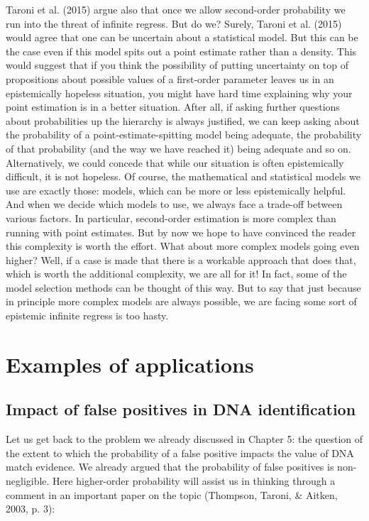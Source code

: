 \documentclass[
  10pt,
  dvipsnames,enabledeprecatedfontcommands]{scrartcl}
\begin{document}
Taroni et al. (2015) argue also that once we allow second-order
probability we run into the threat of infinite regress. But do we?
Surely, Taroni et al. (2015) would agree that one can be uncertain about
a statistical model. But this can be the case even if this model spits
out a point estimate rather than a density. This would suggest that if
you think the possibility of putting uncertainty on top of propositions
about possible values of a first-order parameter leaves us in an
epistemically hopeless situation, you might have hard time explaining
why your point estimation is in a better situation. After all, if asking
further questions about probabilities up the hierarchy is always
justified, we can keep asking about the probability of a
point-estimate-spitting model being adequate, the probability of that
probability (and the way we have reached it) being adequate and so on.
Alternatively, we could concede that while our situation is often
epistemically difficult, it is not hopeless. Of course, the mathematical
and statistical models we use are exactly those: models, which can be
more or less epistemically helpful. And when we decide which models to
use, we always face a trade-off between various factors. In particular,
second-order estimation is more complex than running with point
estimates. But by now we hope to have convinced the reader this
complexity is worth the effort. What about more complex models going
even higher? Well, if a case is made that there is a workable approach
that does that, which is worth the additional complexity, we are all for
it! In fact, some of the model selection methods can be thought of this
way. But to say that just because in principle more complex models are
always possible, we are facing some sort of epistemic infinite regress
is too hasty.

\hypertarget{examples-of-applications}{%
\section{Examples of applications}\label{examples-of-applications}}

\hypertarget{impact-of-false-positives-in-dna-identification}{%
\subsection{Impact of false positives in DNA
identification}\label{impact-of-false-positives-in-dna-identification}}

Let us get back to the problem we already discussed in Chapter 5: the
question of the extent to which the probability of a false positive
impacts the value of DNA match evidence. We already argued that the
probability of false positives is non-negligible. Here higher-order
probability will assist us in thinking through a comment in an important
paper on the topic (Thompson, Taroni, \& Aitken, 2003, p. 3):
\end{document}
